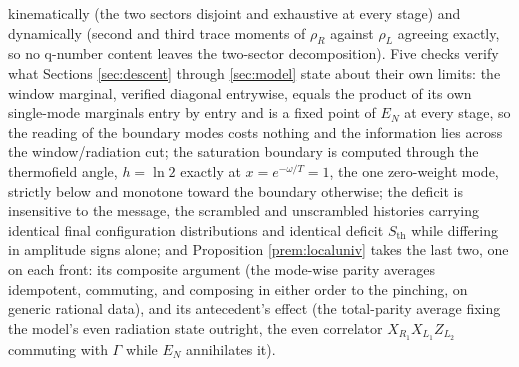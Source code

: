 \documentclass[11pt]{article}
\theoremstyle{definition}
\newcommand{\Sth}{S_{\mathrm{th}}}
\newcommand{\EN}{E_{N}}
\begin{document}
kinematically (the two sectors disjoint and exhaustive at every stage) and dynamically (second and third trace moments of $\rho_R$ against $\rho_L$ agreeing exactly, so no q-number content leaves the two-sector decomposition). Five checks verify what Sections \ref{sec:descent} through \ref{sec:model} state about their own limits: the window marginal, verified diagonal entrywise, equals the product of its own single-mode marginals entry by entry and is a fixed point of $\EN$ at every stage, so the reading of the boundary modes costs nothing and the information lies across the window/radiation cut; the saturation boundary is computed through the thermofield angle, $h = \ln 2$ exactly at $x = e^{-\omega/T} = 1$, the one zero-weight mode, strictly below and monotone toward the boundary otherwise; the deficit is insensitive to the message, the scrambled and unscrambled histories carrying identical final configuration distributions and identical deficit $\Sth$ while differing in amplitude signs alone; and Proposition \ref{prem:localuniv} takes the last two, one on each front: its composite argument (the mode-wise parity averages idempotent, commuting, and composing in either order to the pinching, on generic rational data), and its antecedent's effect (the total-parity average fixing the model's even radiation state outright, the even correlator $X_{R_1}X_{L_1}Z_{L_2}$ commuting with $\Gamma$ while $\EN$ annihilates it).
\end{document}

